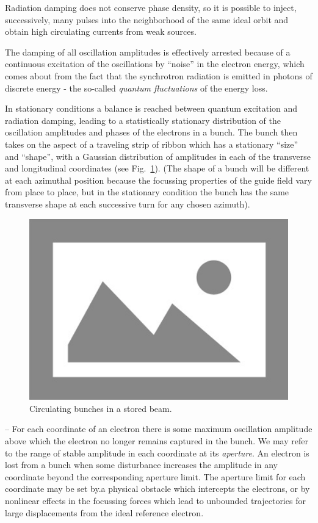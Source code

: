 Radiation damping does not conserve phase density, so it is possible to inject, successively, many pulses into the neighborhood of the same ideal orbit and obtain high circulating currents from weak sources.

The damping of all oscillation amplitudes is effectively arrested because of a continuous excitation of the oscillations by “noise” in the electron energy, which comes about from the fact that the synchrotron radiation is emitted in photons of discrete energy - the so-called \emph{quantum fluctuations} of the energy loss.

In stationary conditions a balance is reached between quantum excitation and radiation damping, leading to a statistically stationary distribution of the oscillation amplitudes and phases of the electrons in a bunch. The bunch then takes on the aspect of a traveling strip of ribbon which has a stationary “size” and “shape”, with a Gaussian distribution of amplitudes in each of the transverse and longitudinal coordinates (see Fig.~\ref{fig:fig2}). (The shape of a bunch will be different at each azimuthal position because the focussing properties of the guide field vary from place to place, but in the stationary condition the bunch has the same transverse shape at each successive turn for any chosen azimuth).

\begin{figure}[!htb]
	\centering
	\includegraphics[width=0.55\linewidth]{./Figuras/placeholder.png}
	\caption{Circulating bunches in a stored beam.}
	\label{fig:fig2}
\end{figure}

-- For each coordinate of an electron there is some maximum oscillation amplitude above which the electron no longer remains captured in the bunch. We may refer to the range of stable amplitude in each coordinate at its \emph{aperture}. An electron is lost from a bunch when some disturbance increases the amplitude in any coordinate beyond the corresponding aperture limit. The aperture limit for each coordinate may be set by.a physical obstacle which intercepts the electrons, or by nonlinear effects in the focussing forces which lead to unbounded trajectories for large displacements from the ideal reference electron.

